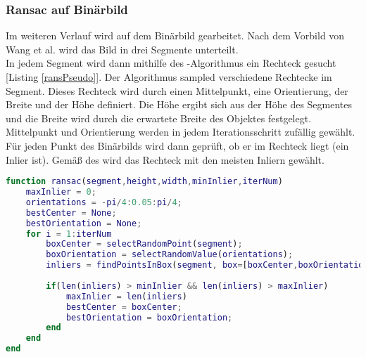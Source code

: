 \subsubsection{Ransac auf Binärbild}
Im weiteren Verlauf wird auf dem  Binärbild gearbeitet. Nach dem Vorbild von Wang et al. \cite{wang2004lane} wird das Bild in drei Segmente unterteilt.\\
In jedem Segment wird dann mithilfe des \rans -Algorithmus ein Rechteck gesucht [Listing \ref{ransPseudo}]. Der Algorithmus sampled verschiedene Rechtecke im Segment. Dieses Rechteck wird durch einen Mittelpunkt, eine Orientierung, der Breite und der Höhe definiert. Die Höhe ergibt sich aus der Höhe des Segmentes und die Breite wird durch die erwartete Breite des Objektes festgelegt. Mittelpunkt und Orientierung werden in jedem Iterationsschritt zufällig gewählt.\\
Für jeden Punkt des Binärbilds wird dann geprüft, ob er im Rechteck liegt (ein Inlier ist). Gemäß des \rans wird das Rechteck mit den meisten Inliern gewählt.\\
\begin{lstlisting}[language=Matlab,caption=Eingesetzter Ransac als Pseudocode,label=ransPseudo]
function ransac(segment,height,width,minInlier,iterNum)
	maxInlier = 0;
	orientations = -pi/4:0.05:pi/4;
	bestCenter = None;
	bestOrientation = None;
	for i = 1:iterNum
		boxCenter = selectRandomPoint(segment);
		boxOrientation = selectRandomValue(orientations);
		inliers = findPointsInBox(segment, box=[boxCenter,boxOrientation,height,width]);
		
		if(len(inliers) > minInlier && len(inliers) > maxInlier)
			maxInlier = len(inliers)
			bestCenter = boxCenter;
			bestOrientation = boxOrientation;
		end
	end
end
\end{lstlisting}

